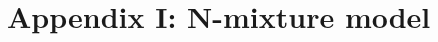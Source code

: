 \documentclass[11pt]{article}
\begin{document}

\renewcommand{\thefigure}{A\arabic{figure}}
\renewcommand{\theequation}{A\arabic{equation}}
\renewcommand{\thetable}{A\arabic{table}}
\setcounter{equation}{0}
\setcounter{figure}{0}
\setcounter{table}{0}

\section*{Appendix I: N-mixture model}
\end{document}
